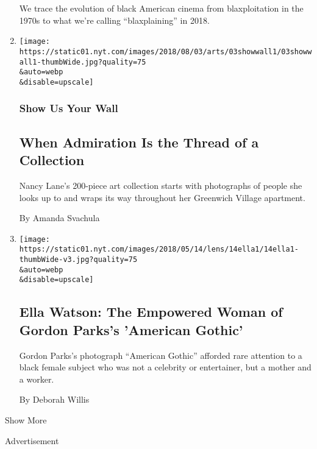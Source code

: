 \begin{enumerate}
  We trace the evolution of black American cinema from blaxploitation in
  the 1970s to what we're calling ``blaxplaining'' in 2018.
\item
  \href{/2018/08/02/arts/design/show-us-your-wall-nancy-lane-studio-museum.html}{}

  \texttt{[image: https://static01.nyt.com/images/2018/08/03/arts/03showwall1/03showwall1-thumbWide.jpg?quality=75\\\&auto=webp\\\&disable=upscale]}

  \hypertarget{show-us-your-wall}{%
  \subsubsection{Show Us Your Wall}\label{show-us-your-wall}}

  \hypertarget{when-admiration-is-the-thread-of-a-collection}{%
  \subsection{When Admiration Is the Thread of a
  Collection}\label{when-admiration-is-the-thread-of-a-collection}}

  Nancy Lane's 200-piece art collection starts with photographs of
  people she looks up to and wraps its way throughout her Greenwich
  Village apartment.

  By Amanda Svachula
\item
  \href{/2018/05/14/lens/ella-watson-the-empowered-woman-of-gordon-parks-american-gothic-.html}{}

  \texttt{[image: https://static01.nyt.com/images/2018/05/14/lens/14ella1/14ella1-thumbWide-v3.jpg?quality=75\\\&auto=webp\\\&disable=upscale]}

  \hypertarget{ella-watson-the-empowered-woman-of-gordon-parkss-american-gothic}{%
  \subsection{Ella Watson: The Empowered Woman of Gordon Parks's
  'American
  Gothic'}\label{ella-watson-the-empowered-woman-of-gordon-parkss-american-gothic}}

  Gordon Parks's photograph ``American Gothic'' afforded rare attention
  to a black female subject who was not a celebrity or entertainer, but
  a mother and a worker.

  By Deborah Willis
\end{enumerate}

Show More

Advertisement

